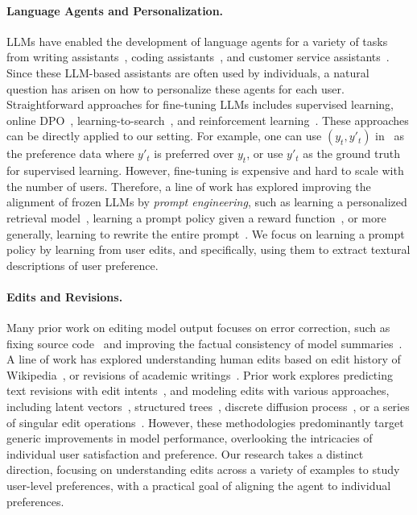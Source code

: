 \paragraph{Language Agents and Personalization.} LLMs have enabled the development of language agents for a variety of tasks from writing assistants~\citep{Lee2024ADS}, coding assistants~\citep{githubcopilot}, and customer service assistants~\citep{brynjolfsson2023generative}. Since these LLM-based assistants are often used by individuals, a natural question has arisen on how to personalize these agents for each user. Straightforward approaches for fine-tuning LLMs includes supervised learning, online DPO~\citep{guo2024direct}, learning-to-search~\citep{chang2023learning}, and reinforcement learning~\citep{ouyang2022training}. These approaches can be directly applied to our setting. For example, one can use $(y_t, y'_t)$ in~ as the preference data where $y'_t$ is preferred over $y_t$, or use $y'_t$ as the ground truth for supervised learning. However, fine-tuning is expensive and hard to scale with the number of users. Therefore, a line of work has explored improving the alignment of frozen LLMs by \emph{prompt engineering}, such as learning a personalized retrieval model~\citep{mysore2023pearl}, learning a prompt policy given a reward function~\citep{deng2022rlprompt}, or more generally, learning to rewrite the entire prompt~\citep{li2023automatic}. We focus on learning a prompt policy by learning from user edits, and specifically, using them to extract textural descriptions of user preference.

\paragraph{Edits and Revisions.} Many prior work on editing model output focuses on error correction, such as fixing source code~\citep{Yin2018LearningTR,Chen2018SequenceRSL,Reid2023DiffusERDV} and improving the factual consistency of model summaries~\citep{Cao2020FactualEC,Liu2022OnIS,Balachandran2022CorrectingDF}. A line of work has explored understanding human edits based on edit history of Wikipedia~\citep{Botha2018LearningTS,Faltings2020TextEB,Rajagopal2022OneDM,Reid2022LearningTM,Laban2023SWiPEAD}, or revisions of academic writings~\citep{Mita2022TowardsAD,Du2022UnderstandingIR,DArcy2023ARIESAC}. Prior work explores predicting text revisions with edit intents~\citep{Brody2020ASM,Kim2022ImprovingIT,Chong2023LeveragingPT}, and modeling edits with various approaches, including latent vectors~\citep{Guu2017GeneratingSB,MarreseTaylor2020VariationalIF,MarreseTaylor2023EditAR}, structured trees~\citep{Yao2021LearningSE}, discrete diffusion process~\citep{Reid2023DiffusERDV}, or a series of singular edit operations~\citep{Stahlberg2020Seq2EditsST,Mallinson2020FELIXFT,Agrawal2022AnIL,Zhang2022CoditT5PF,Liu2023SecondTA}. However, these methodologies predominantly target generic improvements in model performance, overlooking the intricacies of individual user satisfaction and preference. Our research takes a distinct direction, focusing on understanding edits across a variety of examples to study user-level preferences, with a practical goal of aligning the agent to individual preferences.
